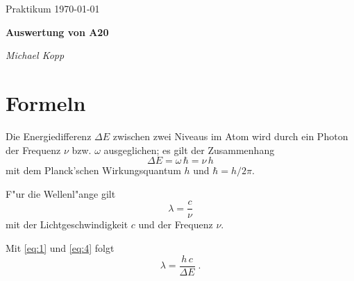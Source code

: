 \documentclass[a4paper,12pt]{article}
\begin{document}
\newcommand{\NAME}{Michael Kopp}
\newcommand{\FACH}{Praktikum}
\newcommand{\TITEL}{Auswertung von A20}
\newcommand{\DATUM}{\today}


\pagestyle{plain} 




\sloppy

\begin{center}
\FACH
\hfill
\DATUM
\end{center}

\vspace{-5mm} %

\begin{center}
  \begin{Large}
 \textbf{\TITEL}
  \end{Large}
\end{center}

\vspace{-3mm}

\begin{center}
\hrulefill
\quad 
\textit{\NAME}
\,
\hrulefill
\end{center}
 
 

\noindent


\section*{Formeln}
\label{sec:formeln-1}

Die Energiedifferenz $\Delta E$ zwischen zwei Niveaus im Atom wird
durch ein Photon der Frequenz $\nu$ bzw. $\omega$ ausgeglichen; es
gilt der Zusammenhang
\begin{equation}
  \label{eq:1}
  \Delta  E = \omega \, \hbar = \nu \, h
\end{equation}
mit dem Planck'schen Wirkungsquantum $h$ und $\hbar = h/2\pi$.

F"ur die Wellenl"ange gilt
\begin{equation}
  \label{eq:4}
  \lambda = \frac{c}{\nu}
\end{equation}
mit der Lichtgeschwindigkeit $c$ und der Frequenz $\nu$.

Mit \eqref{eq:1} und \eqref{eq:4} folgt
\begin{equation}
  \label{eq:5}
  \lambda = \frac{h \, c}{\Delta  E} \;.
\end{equation}
\end{document}
